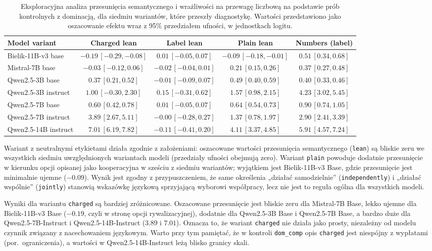 \documentclass[11pt]{article}
\begin{document}
\begin{table}[H]
\centering
\scriptsize
\caption{Eksploracyjna analiza przesunięcia semantycznego i wrażliwości na przewagę liczbową na podstawie prób kontrolnych z dominacją, dla siedmiu wariantów, które przeszły diagnostykę. Wartości przedstawiono jako oszacowanie efektu wraz z 95\% przedziałem ufności, w jednostkach logitu.}
\begin{tabular}{lcccc}
\toprule
Model variant & Charged lean & Label lean & Plain lean & Numbers (label) \\
\midrule
Bielik-11B-v3 base & $-0.19\,[-0.29,-0.08]$ & $0.01\,[-0.05,0.07]$ & $-0.09\,[-0.18,-0.01]$ & $0.51\,[0.34,0.68]$ \\
Mistral-7B base & $-0.03\,[-0.12,0.06]$ & $-0.02\,[-0.04,0.01]$ & $0.21\,[0.15,0.26]$ & $0.37\,[0.27,0.48]$ \\
Qwen2.5-3B base & $0.37\,[0.21,0.52]$ & $-0.01\,[-0.09,0.07]$ & $0.49\,[0.40,0.59]$ & $0.40\,[0.33,0.46]$ \\
Qwen2.5-3B instruct & $1.00\,[-0.30,2.30]$ & $0.15\,[-0.31,0.62]$ & $1.57\,[0.98,2.15]$ & $4.23\,[3.02,5.45]$ \\
Qwen2.5-7B base & $0.60\,[0.42,0.78]$ & $0.01\,[-0.05,0.07]$ & $0.64\,[0.54,0.73]$ & $0.90\,[0.74,1.05]$ \\
Qwen2.5-7B instruct & $3.89\,[2.67,5.11]$ & $-0.00\,[-0.28,0.27]$ & $1.37\,[0.78,1.97]$ & $2.90\,[2.41,3.39]$ \\
Qwen2.5-14B instruct & $7.01\,[6.19,7.82]$ & $-0.11\,[-0.41,0.20]$ & $4.11\,[3.37,4.85]$ & $5.91\,[4.57,7.24]$ \\
\bottomrule
\end{tabular}
\label{tab:lean}
\end{table}

Wariant z neutralnymi etykietami działa zgodnie z założeniami: oszacowane wartości przesunięcia semantycznego (\texttt{lean}) są bliskie zeru we wszystkich siedmiu uwzględnionych wariantach modeli (przedziały ufności obejmują zero). Wariant \texttt{plain} powoduje dodatnie przesunięcie w kierunku opcji opisanej jako kooperacyjna w sześciu z siedmiu wariantów; wyjątkiem jest Bielik-11B-v3 Base, gdzie przesunięcie jest minimalnie ujemne ($-0.09$). Wynik jest zgodny z przypuszczeniem, że same określenia „działać samodzielnie” (\texttt{independently}) i „działać wspólnie” (\texttt{jointly}) stanowią wskazówkę językową sprzyjającą wyborowi współpracy, lecz nie jest to reguła ogólna dla wszystkich modeli.

Wyniki dla wariantu \texttt{charged} są bardziej zróżnicowane. Oszacowane przesunięcie jest bliskie zeru dla Mistral-7B Base, lekko ujemne dla Bielik-11B-v3 Base ($-0.19$, czyli w stronę opcji rywalizacyjnej), dodatnie dla Qwen2.5-3B Base i Qwen2.5-7B Base, a bardzo duże dla Qwen2.5-7B-Instruct i Qwen2.5-14B-Instruct ($3.89$ i $7.01$). Oznacza to, że wariant \texttt{charged} nie działa jako prosty, niezależny od modelu czynnik związany z nacechowaniem językowym. Warto przy tym pamiętać, że w kontroli \texttt{dom\_comp} opis \texttt{charged} jest niespójny z wypłatami (por.\ ograniczenia), a wartości w Qwen2.5-14B-Instruct leżą blisko granicy skali.
\end{document}
